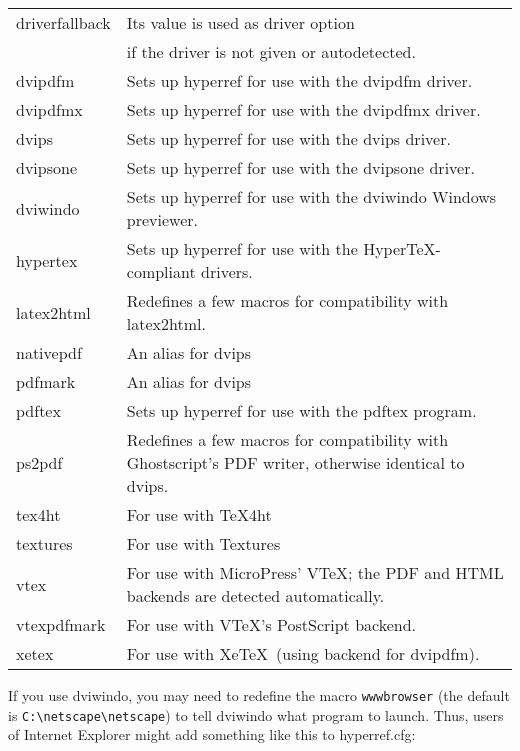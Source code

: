 \documentclass{article}
\newcommand*{\xpackage}[1]{\textsf{#1}}
\newcommand{\bs}{\symbol{'134}}%
\newcommand{\ci}[1]{\texttt{\bs#1}}
\begin{document}
\begin{longtable}{@{}>{\ttfamily}lp{.8\hsize}@{}}
driverfallback & Its value is used as driver option\\
            & if the driver is not given or autodetected.\\
dvipdfm     & Sets up \xpackage{hyperref} for use with the \textsf{dvipdfm} driver.\\
dvipdfmx    & Sets up \xpackage{hyperref} for use with the \textsf{dvipdfmx} driver.\\
dvips       & Sets up \xpackage{hyperref} for use with the \textsf{dvips} driver. \\
dvipsone    & Sets up \xpackage{hyperref} for use with the \textsf{dvipsone} driver. \\
dviwindo    & Sets up \xpackage{hyperref} for use with the \textsf{dviwindo} Windows previewer. \\
hypertex    & Sets up \xpackage{hyperref} for use with the Hyper\TeX-compliant drivers. \\
latex2html  & Redefines a few macros for compatibility with \textsf{latex2html}. \\
nativepdf   & An alias for \textsf{dvips} \\
pdfmark     & An alias for \textsf{dvips} \\
pdftex      & Sets up \xpackage{hyperref} for use with the \textsf{pdftex} program.\\
ps2pdf      & Redefines a few macros for compatibility with
              Ghostscript's PDF writer, otherwise identical to
              \textsf{dvips}. \\
tex4ht      & For use with \textsf{\TeX4ht} \\
textures    & For use with \textsf{Textures} \\
vtex        & For use with MicroPress' \textsf{VTeX}; the PDF
                       and HTML backends are detected automatically. \\
vtexpdfmark & For use with \textsf{VTeX}'s PostScript backend. \\
xetex       & For use with Xe\TeX\ (using backend for dvipdfm).
\end{longtable}
\smallskip

If you use \textsf{dviwindo}, you may need to redefine the macro
\ci{wwwbrowser} (the default is \verb|C:\netscape\netscape|) to tell
\textsf{dviwindo} what program to launch. Thus, users of Internet
Explorer might add something like this to hyperref.cfg:
\end{document}
